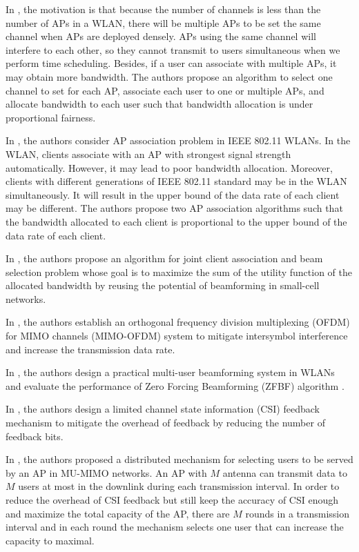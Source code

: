 	In \cite{karimi2014optimal}, the motivation is that because the number of channels is less than the number of APs in a WLAN, there will be multiple APs to be set the same channel when APs are deployed densely. APs using the same channel will interfere to each other, so they cannot transmit to users simultaneous when we perform time scheduling. Besides, if a user can associate with multiple APs, it may obtain more bandwidth. The authors propose an algorithm to select one channel to set for each AP, associate each user to one or multiple APs, and allocate bandwidth to each user such that bandwidth allocation is under proportional fairness.

	In \cite{gong2012ap}, the authors consider AP association problem in IEEE 802.11 WLANs. In the WLAN, clients associate with an AP with strongest signal strength automatically. However, it may lead to poor bandwidth allocation. Moreover, clients with different generations of IEEE 802.11 standard may be in the WLAN simultaneously. It will result in the upper bound of the data rate of each client may be different. The authors propose two AP association algorithms such that the bandwidth allocated to each client is proportional to the upper bound of the data rate of each client.

	In \cite{yoon2013probeam}, the authors propose an algorithm for joint client association and beam selection problem whose goal is to maximize the sum of the utility function of the allocated bandwidth by reusing the potential of beamforming in small-cell networks.
	
	In \cite{li2002mimo}, the authors establish an orthogonal frequency division multiplexing (OFDM) for MIMO channels (MIMO-OFDM) system to mitigate intersymbol interference and increase the transmission data rate.
	
	In \cite{aryafar2010design}, the authors design a practical multi-user beamforming system in WLANs and evaluate the performance of Zero Forcing Beamforming (ZFBF) algorithm \cite{yoo2006optimality}.

	In \cite{yoo2007multi}, the authors design a limited channel state information (CSI) feedback mechanism to mitigate the overhead of feedback by reducing the number of feedback bits.
	
	In \cite{xie2014scalable}, the authors proposed a distributed mechanism for selecting users to be served by an AP in MU-MIMO networks. An AP with $M$ antenna can transmit data to $M$ users at most in the downlink during each transmission interval. In order to reduce the overhead of CSI feedback but still keep the accuracy of CSI enough and maximize the total capacity of the AP, there are $M$ rounds in a transmission interval and in each round the mechanism selects one user that can increase the capacity to maximal.	
		

	